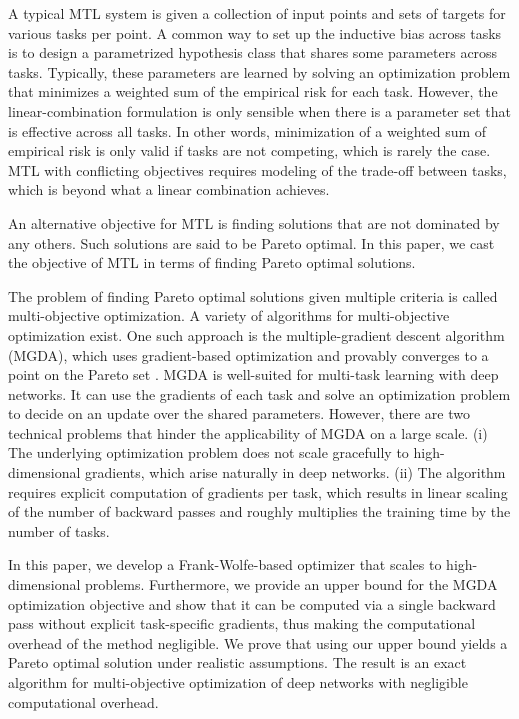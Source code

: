 \documentclass{article}
\begin{document}
A typical MTL system is given a collection of input points and sets of targets for various tasks per point. A common way to set up the inductive bias across tasks is to design a parametrized hypothesis class that shares some parameters across tasks. Typically, these parameters are learned by solving an optimization problem that minimizes a weighted sum of the empirical risk for each task. However, the linear-combination formulation is only sensible when there is a parameter set that is effective across all tasks. In other words, minimization of a weighted sum of empirical risk is only valid if tasks are not competing, which is rarely the case. MTL with conflicting objectives requires modeling of the trade-off between tasks, which is beyond what a linear combination achieves.

An alternative objective for MTL is finding solutions that are not dominated by any others.
Such solutions are said to be Pareto optimal. In this paper, we cast the objective of MTL in terms of finding Pareto optimal solutions.

The problem of finding Pareto optimal solutions given multiple criteria is called multi-objective optimization. A variety of algorithms for multi-objective optimization exist. One such approach is the multiple-gradient descent algorithm (MGDA), which uses gradient-based optimization and provably converges to a point on the Pareto set \citep{Desideri2012}. MGDA is well-suited for multi-task learning with deep networks. It can use the gradients of each task and solve an optimization problem to decide on an update over the shared parameters. However, there are two technical problems that hinder the applicability of MGDA on a large scale. (i) The underlying optimization problem does not scale gracefully to high-dimensional gradients, which arise naturally in deep networks. (ii) The algorithm requires explicit computation of gradients per task, which results in linear scaling of the number of backward passes and roughly multiplies the training time by the number of tasks.

In this paper, we develop a Frank-Wolfe-based optimizer that scales to high-dimensional problems. Furthermore, we provide an upper bound for the MGDA optimization objective and show that it can be computed via a single backward pass without explicit task-specific gradients, thus making the computational overhead of the method negligible. We prove that using our upper bound yields a Pareto optimal solution under realistic assumptions. The result is an exact algorithm for multi-objective optimization of deep networks with negligible computational overhead.
\end{document}
